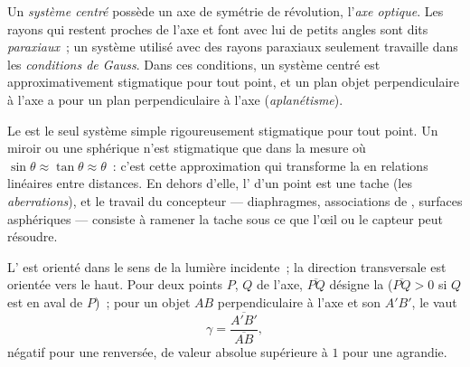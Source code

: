 \begin{definition}\label{def:b1:mirrors-thin-lenses:gauss}
Un \emph{système centré} possède un axe de symétrie de révolution,
l'\emph{axe optique}. Les rayons qui restent proches de l'axe et font
avec lui de petits angles sont dits \emph{paraxiaux}~; un système
utilisé avec des rayons paraxiaux seulement travaille dans les
\emph{conditions de Gauss}. Dans ces conditions, un système centré est
approximativement stigmatique pour tout point, et un plan objet
perpendiculaire à l'axe a pour  un plan perpendiculaire à l'axe
(\emph{aplanétisme}).
\end{definition}
\admitted

\begin{remark}\label{rem:b1:mirrors-thin-lenses:why}
Le  est le seul système simple rigoureusement stigmatique
pour tout point. Un miroir ou une  sphérique n'est stigmatique
que dans la mesure où $\sin\theta \approx \tan\theta \approx \theta$~:
c'est cette approximation qui transforme la  en
relations linéaires entre distances. En dehors d'elle, l' d'un
point est une tache (les \emph{aberrations}), et le travail du
concepteur --- diaphragmes, associations de , surfaces
asphériques --- consiste à ramener la tache sous ce que l'œil ou le
capteur peut résoudre.
\end{remark}

\begin{notation}\label{not:b1:mirrors-thin-lenses:signs}
L' est orienté dans le sens de la lumière incidente~; la
direction transversale est orientée vers le haut. Pour deux points $P$,
$Q$ de l'axe, $\overline{PQ}$ désigne la 
($\overline{PQ} > 0$ si $Q$ est en aval de $P$)~; pour un objet $AB$
perpendiculaire à l'axe et son  $A'B'$, le \emph{} vaut
\[
\gamma = \frac{\overline{A'B'}}{\overline{AB}} ,
\]
négatif pour une  renversée, de valeur absolue supérieure à $1$
pour une  agrandie.
\end{notation}

